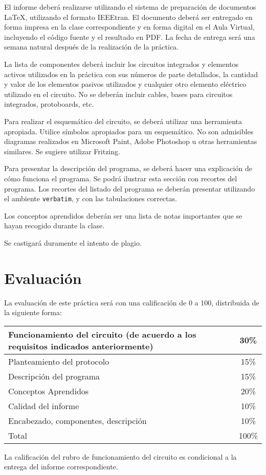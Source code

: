 \documentclass[12pt,letterpaper]{IEEEtran}
\begin{document}
El informe deberá realizarse utilizando el sistema de preparación de documentos \LaTeX, utilizando el formato IEEEtran. El documento deberá ser entregado en forma impresa en la clase correspondiente y en forma digital en el Aula Virtual, incluyendo el código fuente y el resultado en PDF.  La fecha de entrega será una semana natural después de la realización de la práctica.

La lista de componentes deberá incluir los circuitos integrados y elementos activos utilizados en la práctica con sus números de parte detallados, la cantidad y valor de los elementos pasivos utilizados y cualquier otro elemento eléctrico utilizado en el circuito. No se deberán incluir cables, bases para circuitos integrados, protoboards, etc.

Para realizar el esquemático del circuito, se deberá utilizar una herramienta apropiada. Utilice símbolos apropiados para un esquemático. No son admisibles diagramas realizados en Microsoft Paint, Adobe Photoshop u otras herramientas similares. Se sugiere utilizar Fritzing.

Para presentar la descripción del programa, se deberá hacer una explicación de cómo funciona el programa. Se podrá ilustrar esta sección con recortes del programa. Los recortes del listado del programa se deberán presentar utilizando el ambiente \texttt{verbatim}, y con las tabulaciones correctas. 

Los conceptos aprendidos deberán ser una lista de notas importantes que se hayan recogido durante la clase. 

Se castigará duramente el intento de plagio.

\section{Evaluación}

La evaluación de este práctica será con una calificación de 0 a 100, distribuida de la siguiente forma:

\begin{center}
 \begin{tabular}{p{}|c}\hline
   Funcionamiento del circuito (de acuerdo a los requisitos indicados anteriormente) 					     & 30\% \\\hline
   Planteamiento del protocolo			& 15\% \\\hline
   Descripción del programa				& 15\% \\\hline
   Conceptos Aprendidos					& 20\% \\\hline
   Calidad del informe					& 10\% \\\hline
   Encabezado, componentes, descripción & 10\% \\\hline\hline
   Total								& 100\% \\
 \end{tabular}
\end{center}
La calificación del rubro de funcionamiento del circuito es condicional a la entrega del informe correspondiente.
\end{document}
